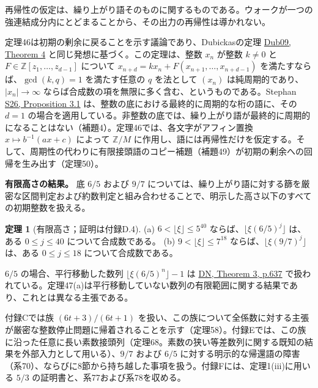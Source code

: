 \documentclass[11pt,reqno]{amsart}
\theoremstyle{definition}
\newtheorem{theorem}{定理}
\theoremstyle{definition}
\theoremstyle{remark}
\begin{document}
再帰性の仮定は、繰り上がり語そのものに関するものである。ウォークが一つの強連結成分内にとどまることから、その出力の再帰性は導かれない。

定理46は初期の剰余に戻ることを示す議論であり、Dubickasの定理 \hyperref[ref-dub09]{Dub09, Theorem 4} と同じ発想に基づく。この定理は、整数 \(x_n\) が整数 \(k\ne0\) と \(F\in\mathbb Z[z_1,\ldots,z_{d-1}]\) について \(x_{n+d}=kx_n+F(x_{n+1},\ldots,x_{n+d-1})\) を満たすならば、\(\gcd(k,q)=1\) を満たす任意の \(q\) を法として \((x_n)\) は純周期的であり、\(|x_n|\to\infty\) ならば合成数の項を無限に多く含む、というものである。Stephan \hyperref[ref-s26]{S26, Proposition 3.1} は、整数の底における最終的に周期的な桁の語に、その \(d=1\) の場合を適用している。非整数の底では、繰り上がり語が最終的に周期的になることはない（補題4）。定理46では、各文字がアフィン置換 \(x\mapsto b^{-1}(ax+c)\) によって \(\mathbb Z/M\) に作用し、語には再帰性だけを仮定する。そして、周期性の代わりに有限接頭語のコピー補題（補題49）が初期の剰余への回帰を生み出す（定理50）。

\textbf{有限高さの結果。} 底 \(6/5\) および \(9/7\) については、繰り上がり語に対する篩を厳密な区間判定および約数判定と組み合わせることで、明示した高さ以下のすべての初期整数を扱える。

\begin{samepage}
\begin{theorem}[有限高さ；証明は付録D.4]\leavevmode\label{thm:47}
(a) \(6<\lfloor\xi\rfloor\le5^{40}\) ならば、\(\lfloor\xi(6/5)^j\rfloor\) は、ある \(0\le j\le40\) について合成数である。
(b) \(9<\lfloor\xi\rfloor\le7^{18}\) ならば、\(\lfloor\xi(9/7)^j\rfloor\) は、ある \(0\le j\le18\) について合成数である。
\label{thm-end:47}
\end{theorem}
\end{samepage}

\(6/5\) の場合、平行移動した数列
\(\lfloor\xi(6/5)^n\rfloor-1\) は
\hyperref[ref-dn]{DN, Theorem 3, p.637} で扱われている。定理47(a)は平行移動していない数列の有限範囲に関する結果であり、これとは異なる主張である。

付録Cでは族 \((6t+3)/(6t+1)\) を扱い、この族について全係数に対する主張が厳密な整数停止問題に帰着されることを示す（定理58）。付録Eでは、この族に沿った任意に長い素数接頭列（定理68。素数の狭い等差数列に関する既知の結果を外部入力として用いる）、\(9/7\) および \(6/5\) に対する明示的な帰還語の障害（系70）、ならびに8節から持ち越した事項を扱う。付録Fには、定理1(iii)に用いる \(5/3\) の証明書と、系77および系78を収める。
\end{document}
